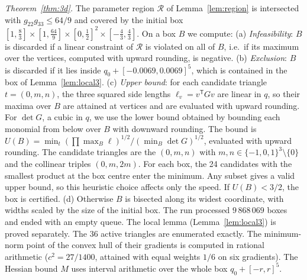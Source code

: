 \documentclass[10pt,twocolumn,a4paper]{article}
\theoremstyle{definition}
\begin{document}
\smallskip\noindent\emph{Theorem~\ref{thm:3d}.} The parameter region $\mathcal R$ of Lemma~\ref{lem:region} is intersected with $g_{22}g_{33}\le64/9$ and covered by the initial box $[1,\frac83]\times[1,\frac{64}9]\times[0,\frac12]^2\times[-\frac43,\frac43]$. On a box $B$ we compute:
(a) \emph{Infeasibility}: $B$ is discarded if a linear constraint of $\mathcal R$ is violated on all of $B$, i.e.\ if its maximum over the vertices, computed with upward rounding, is negative.
(b) \emph{Exclusion}: $B$ is discarded if it lies inside $q_0+[-0.0069,0.0069]^5$, which is contained in the box of Lemma~\ref{lem:local3}.
(c) \emph{Upper bound}: for each candidate triangle $t=(0,m,n)$, the three squared side lengths $\ell_v=v^{\mathsf T}Gv$ are linear in $q$, so their maxima over $B$ are attained at vertices and are evaluated with upward rounding. For $\det G$, a cubic in $q$, we use the lower bound obtained by bounding each monomial from below over $B$ with downward rounding. The bound is $U(B)=\min_t(\prod\max_B\ell)^{1/2}/(\min_B\det G)^{1/2}$, evaluated with upward rounding. The candidate triangles are the $(0,m,n)$ with $m,n\in\{-1,0,1\}^3\setminus\{0\}$ and the collinear triples $(0,m,2m)$. For each box, the 24 candidates with the smallest product at the box centre enter the minimum. Any subset gives a valid upper bound, so this heuristic choice affects only the speed. If $U(B)<3/2$, the box is certified.
(d) Otherwise $B$ is bisected along its widest coordinate, with widths scaled by the size of the initial box.
The run processed $9\,868\,069$ boxes and ended with an empty queue. The local lemma (Lemma~\ref{lem:local3}) is proved separately. The 36 active triangles are enumerated exactly. The minimum-norm point of the convex hull of their gradients is computed in rational arithmetic ($c^2=27/1400$, attained with equal weights $1/6$ on six gradients). The Hessian bound $M$ uses interval arithmetic over the whole box $q_0+[-r,r]^5$.
\end{document}

